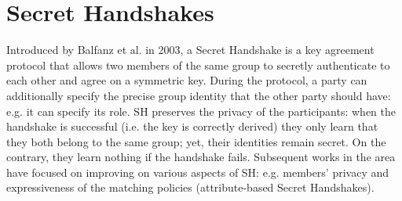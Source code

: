 \section{Secret Handshakes}\label{sec:sh}

Introduced by Balfanz et al. \cite{Balfanz} in 2003, a Secret Handshake is a key agreement protocol that allows two members of the same group to secretly authenticate to each other and agree on a symmetric key.
During the protocol, a party can additionally specify the precise group identity that the other party should have: e.g. it can specify its role.
\newline\newline
SH preserves the privacy of the participants: when the handshake is successful (i.e. the key is correctly derived) they only learn that they both belong to the same group; yet, their identities remain secret.
On the contrary, they learn nothing if the handshake fails.
\newline\newline
Subsequent works in the area have focused on improving on various aspects of SH: e.g. members' privacy and expressiveness of the matching policies (attribute-based Secret Handshakes).
